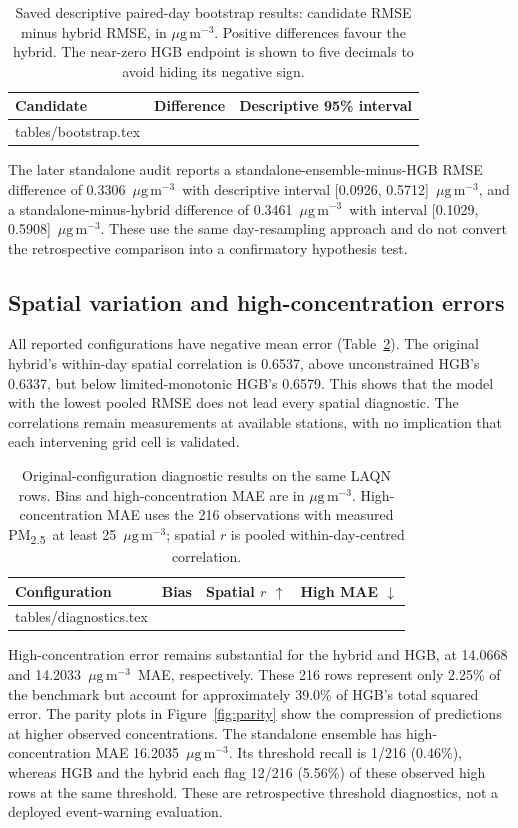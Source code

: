 \documentclass[11pt,a4paper]{article}
\makeatletter
\newcommand{\pmfine}{PM\textsubscript{2.5}}
\newcommand{\ug}{\ensuremath{\mu\mathrm{g}\,\mathrm{m}^{-3}}}
\newcommand{\tableinput}[1]{\@@input #1 }
\makeatother
\begin{document}
\begin{table}[tb]
\caption{Saved descriptive paired-day bootstrap results: candidate RMSE minus
hybrid RMSE, in \ug. Positive differences favour the hybrid. The near-zero HGB
endpoint is shown to five decimals to avoid hiding its negative sign.}
\label{tab:bootstrap}
\centering\small
\begin{tabular}{@{}lrl@{}}
\toprule
Candidate & Difference & Descriptive 95\% interval \\
\midrule
\tableinput{tables/bootstrap.tex}
\bottomrule
\end{tabular}
\end{table}

The later standalone audit reports a standalone-ensemble-minus-HGB RMSE
difference of 0.3306~\ug\ with descriptive interval [0.0926, 0.5712]~\ug,
and a standalone-minus-hybrid difference of 0.3461~\ug\ with interval
[0.1029, 0.5908]~\ug. These use the same day-resampling approach and do not
convert the retrospective comparison into a confirmatory hypothesis test.

\subsection{Spatial variation and high-concentration errors}
All reported configurations have negative mean error
(Table~\ref{tab:diagnostics}). The original hybrid's within-day spatial correlation is
0.6537, above unconstrained HGB's 0.6337, but below limited-monotonic HGB's
0.6579. This shows that the model with the lowest pooled RMSE does not lead
every spatial diagnostic. The correlations remain measurements at available
stations, with no implication that each intervening grid cell is validated.

\begin{table}[tb]
\caption{Original-configuration diagnostic results on the same LAQN rows. Bias and high-concentration
MAE are in \ug. High-concentration MAE uses the 216 observations with measured
\pmfine\ at least 25~\ug; spatial $r$ is pooled within-day-centred correlation.}
\label{tab:diagnostics}
\centering\small
\begin{tabular}{@{}lrrr@{}}
\toprule
Configuration & Bias & Spatial $r$ $\uparrow$ & High MAE $\downarrow$ \\
\midrule
\tableinput{tables/diagnostics.tex}
\bottomrule
\end{tabular}
\end{table}

High-concentration error remains substantial for the hybrid and HGB, at
14.0668 and 14.2033~\ug\ MAE, respectively. These 216 rows represent only
2.25\% of the benchmark but account for approximately 39.0\% of HGB's total
squared error. The parity plots in Figure~\ref{fig:parity} show the compression
of predictions at higher observed concentrations. The standalone ensemble has
high-concentration MAE 16.2035~\ug. Its threshold recall is 1/216 (0.46\%),
whereas HGB and the hybrid each flag 12/216 (5.56\%) of these observed high
rows at the same threshold. These are retrospective threshold diagnostics,
not a deployed event-warning evaluation.
\end{document}
